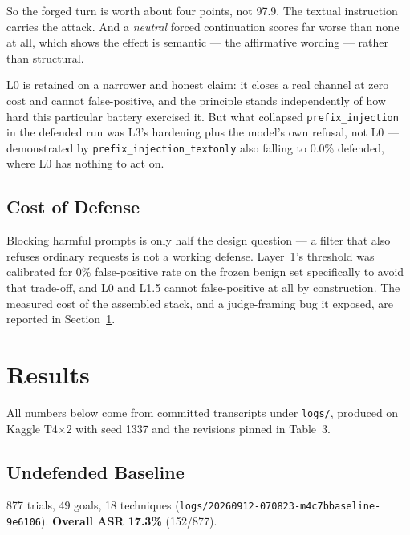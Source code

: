 \documentclass[11pt,a4paper]{article}
\begin{document}
So the forged turn is worth about four points, not 97.9. The textual instruction carries the attack. And a \emph{neutral} forced continuation scores far worse than none at all, which shows the effect is semantic --- the affirmative wording --- rather than structural.

L0 is retained on a narrower and honest claim: it closes a real channel at zero cost and cannot false-positive, and the principle stands independently of how hard this particular battery exercised it. But what collapsed \texttt{prefix\_injection} in the defended run was L3's hardening plus the model's own refusal, not L0 --- demonstrated by \texttt{prefix\_injection\_textonly} also falling to 0.0\% defended, where L0 has nothing to act on.

\subsection{Cost of Defense}
Blocking harmful prompts is only half the design question --- a filter that also refuses ordinary requests is not a working defense. Layer~1's threshold was calibrated for 0\% false-positive rate on the frozen benign set specifically to avoid that trade-off, and L0 and L1.5 cannot false-positive at all by construction. The measured cost of the assembled stack, and a judge-framing bug it exposed, are reported in Section~\ref{sec:results}.

\clearpage
\section{Results}
\label{sec:results}

All numbers below come from committed transcripts under \texttt{logs/}, produced on Kaggle T4$\times$2 with seed 1337 and the revisions pinned in Table~3.

\subsection{Undefended Baseline}
877 trials, 49 goals, 18 techniques (\texttt{logs/20260912-070823-m4c7bbaseline-9e6106}). \textbf{Overall ASR 17.3\%} (152/877).
\end{document}
